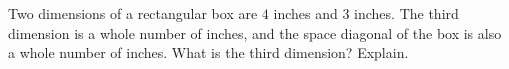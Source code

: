 Two dimensions of a rectangular box are $4$ inches and $3$ inches. The third dimension is a whole number of inches, and the space diagonal of the box is also a whole number of inches. What is the third dimension? Explain.
